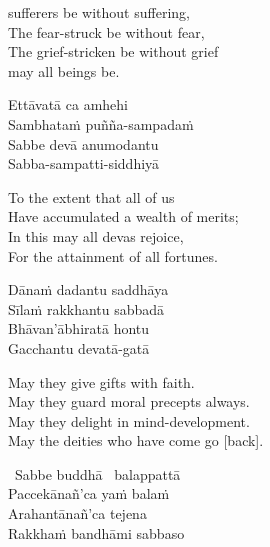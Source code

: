 \begin{english-verses}
  [May] sufferers be without suffering,\\
  The fear-struck be without fear,\\
  The grief-stricken be without grief\\\relax
  [Thus] may all beings be.
\end{english-verses}

\begin{pali-hang-continued}
  Ettāvatā ca amhehi\\
  Sambhataṁ puñña-sampadaṁ\\
  Sabbe devā anumodantu\ifdigital\makeatletter\hyperlink{endnote128-appendix}\makeatother\fi\\
  Sabba-sampatti-siddhiyā
\end{pali-hang-continued}

\begin{english-verses}
  To the extent that all of us\\
  Have accumulated a wealth of merits;\\
  In this may all devas rejoice,\\
  For the attainment of all fortunes.
\end{english-verses}

\ifninebythirteen\clearpage\fi

\begin{pali-hang-continued}
  Dānaṁ dadantu saddhāya\\
  Sīlaṁ rakkhantu sabbadā\\
  Bhāvan'ābhiratā hontu\\
  Gacchantu devatā-gatā
\end{pali-hang-continued}

\begin{english-verses}
  May they give gifts with faith.\\
  May they guard moral precepts always.\\
  \ifbfive\enlargethispage{1\baselineskip}\fi
  May they delight in mind-development.\\
  May the deities who have come go [back].
\end{english-verses}


\begin{pali-hang-continued}
  \anglebracketleft\ \hspace{-0.5mm}Sabbe buddhā \hspace{-0.5mm}\anglebracketright\ balappattā\\
  Paccekānañ'ca yaṁ balaṁ\\
  Arahantānañ'ca tejena\\
  Rakkhaṁ bandhāmi sabbaso
\end{pali-hang-continued}

